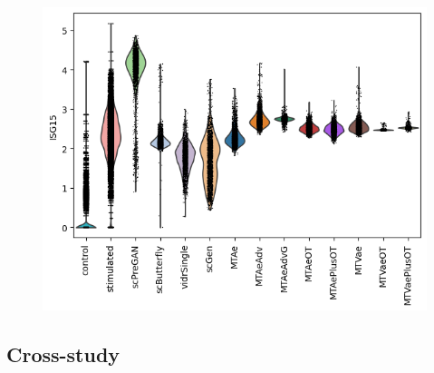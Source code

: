 \documentclass[12pt, a4paper]{article}
\begin{document}
\begin{figure}[h!]
    \centering
    \includegraphics[width=.85\textwidth]{violins_pbmc.png}
    \caption{}
    \label{fig:selected_pbmc_distance}
\end{figure}


\clearpage

\subsection{Cross-study}
\end{document}
